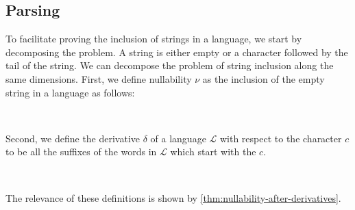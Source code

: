 \subsection{Parsing}

To facilitate proving the inclusion of strings in a language, we start by decomposing the problem. A string is either empty or a character followed by the tail of the string. We can decompose the problem of string inclusion along the same dimensions. First, we define nullability $ν$ as the inclusion of the empty string in a language as follows:
\begin{code}%
%
\>[4]\AgdaSpace{}%
\AgdaSymbol{:}\AgdaSpace{}%
\AgdaSpace{}%
\AgdaSpace{}%
\<%
\\
%
\>[4]\AgdaSpace{}%
\AgdaSpace{}%
\AgdaSymbol{=}\AgdaSpace{}%
\AgdaSpace{}%
\AgdaInductiveConstructor{[]}\<%
\end{code}
Second, we define the derivative $δ$ of a language $ℒ$ with respect to the character $c$ to be all the suffixes of the words in $ℒ$ which start with the $c$.
\begin{code}%
%
\>[4]\AgdaSpace{}%
\AgdaSymbol{:}\AgdaSpace{}%
\AgdaSpace{}%
\AgdaSpace{}%
\AgdaSpace{}%
\AgdaSpace{}%
\<%
\\
%
\>[4]\AgdaSpace{}%
\AgdaSpace{}%
\AgdaSpace{}%
\AgdaSymbol{=}\AgdaSpace{}%
\AgdaSpace{}%
\AgdaSpace{}%
\AgdaSpace{}%
\AgdaSpace{}%
\AgdaSymbol{(}\AgdaSpace{}%
\AgdaSpace{}%
\AgdaSymbol{)}\<%
\end{code}
The relevance of these definitions is shown by \cref{thm:nullability-after-derivatives}.
